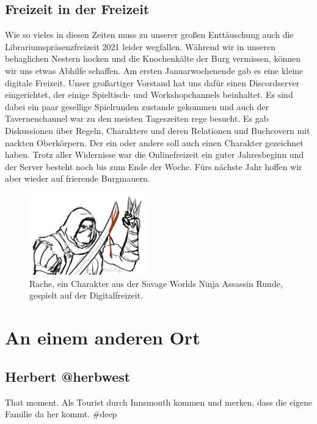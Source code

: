 \documentclass[final]{multiversum}
\begin{document}
\subsection{Freizeit in der Freizeit}
Wie so vieles in diesen Zeiten muss zu unserer großen Enttäuschung auch die Librariumspräsenzfreizeit 2021 leider wegfallen.
Während wir in unseren behaglichen Nestern hocken und die Knochenkälte der Burg vermissen, können wir uns etwas Abhilfe schaffen.
Am ersten Januarwochenende gab es eine kleine digitale Freizeit.
Unser großartiger Vorstand hat uns dafür einen Discordserver eingerichtet, der einige Spieltisch- und Workshopchannels beinhaltet.
Es sind dabei ein paar gesellige Spielrunden zustande gekommen und auch der Tavernenchannel war zu den meisten Tageszeiten rege besucht.
Es gab Diskussionen über Regeln, Charaktere und deren Relationen und Buchcovern mit nackten Oberkörpern.
Der ein oder andere soll auch einen Charakter gezeichnet haben.
Trotz aller Widernisse war die Onlinefreizeit ein guter Jahresbeginn und der Server besteht noch bis zum Ende der Woche.
Fürs nächste Jahr hoffen wir aber wieder auf frierende Burgmauern.

\begin{figure}[h]
  \includegraphics[width=0.45\textwidth]{src/img/ninja_assassin_rache_for_multiversum.jpg}\\
  Rache, ein Charakter aus der Savage Worlds Ninja Assassin Runde, gespielt auf der Digitalfreizeit.
\end{figure}

\section{An einem anderen Ort}

\subsection{Herbert @herbwest}
That moment. Als Tourist durch Innsmouth kommen und merken, dass die eigene Familie da her kommt. \#deep
\end{document}

